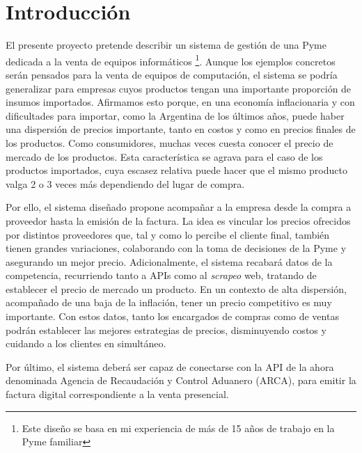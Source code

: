 \section{Introducción}

El presente proyecto pretende describir un sistema de gestión de una Pyme dedicada a la venta de equipos informáticos
\footnote{Este diseño se basa en mi experiencia de más de 15 años de trabajo en la Pyme familiar}.
Aunque los ejemplos concretos serán pensados para la venta de equipos de computación, 
el sistema se podría generalizar para empresas cuyos productos tengan una importante proporción de insumos importados.
Afirmamos esto porque,
en una economía inflacionaria y con dificultades para importar,
como la Argentina de los últimos años,
puede haber una dispersión de precios importante,
tanto en costos y como en precios finales de los productos.
Como consumidores, 
muchas veces cuesta conocer el precio de mercado de los productos. 
Esta característica se agrava para el caso de los productos importados,
cuya escasez relativa puede hacer que el mismo producto valga 2 o 3 veces más dependiendo del lugar de compra.

Por ello, 
el sistema diseñado propone acompañar a la empresa desde la compra a proveedor hasta la emisión de la factura.
La idea es vincular los precios ofrecidos por distintos proveedores que,
tal y como lo percibe el cliente final,
también tienen grandes variaciones,
colaborando con la toma de decisiones de la Pyme y asegurando un mejor precio.
Adicionalmente,
el sistema recabará datos de la competencia,
recurriendo tanto a APIs como al \textit{scrapeo} web,
tratando de establecer el precio de mercado un producto.
En un contexto de alta dispersión, 
acompañado de una baja de la inflación,
tener un precio competitivo es muy importante.
Con estos datos,
tanto los encargados de compras como de ventas podrán establecer las mejores estrategias de precios,
disminuyendo costos y cuidando a los clientes en simultáneo.

Por último,
el sistema deberá ser capaz de conectarse con la API de la ahora denominada
Agencia de Recaudación y Control Aduanero (ARCA),
para emitir la factura digital correspondiente a la venta presencial.